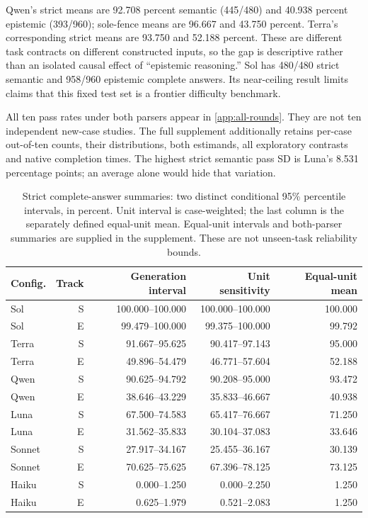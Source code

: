 \documentclass[a4paper,preprint,12pt,numbers,nopreprintline]{elsarticle}
\begin{document}
Qwen's strict means are 92.708 percent semantic (445/480) and 40.938 percent epistemic (393/960); sole-fence means are 96.667 and 43.750 percent. Terra's corresponding strict means are 93.750 and 52.188 percent. These are different task contracts on different constructed inputs, so the gap is descriptive rather than an isolated causal effect of ``epistemic reasoning.'' Sol has 480/480 strict semantic and 958/960 epistemic complete answers. Its near-ceiling result limits claims that this fixed test set is a frontier difficulty benchmark.

All ten pass rates under both parsers appear in \ref{app:all-rounds}. They are not ten independent new-case studies. The full supplement additionally retains per-case out-of-ten counts, their distributions, both estimands, all exploratory contrasts and native completion times. The highest strict semantic pass SD is Luna's 8.531 percentage points; an average alone would hide that variation.
\begin{table}[htbp]\centering\scriptsize
\caption{Strict complete-answer summaries: two distinct conditional 95\% percentile intervals, in percent. Unit interval is case-weighted; the last column is the separately defined equal-unit mean. Equal-unit intervals and both-parser summaries are supplied in the supplement. These are not unseen-task reliability bounds.}\label{tab:ten-pass-intervals}
\setlength{\tabcolsep}{3pt}
\begin{tabular}{lrrrr}\toprule
Config. & Track & Generation interval & Unit sensitivity & Equal-unit mean\\\midrule
Sol & S & 100.000--100.000 & 100.000--100.000 & 100.000\\
Sol & E & 99.479--100.000 & 99.375--100.000 & 99.792\\
Terra & S & 91.667--95.625 & 90.417--97.143 & 95.000\\
Terra & E & 49.896--54.479 & 46.771--57.604 & 52.188\\
Qwen & S & 90.625--94.792 & 90.208--95.000 & 93.472\\
Qwen & E & 38.646--43.229 & 35.833--46.667 & 40.938\\
Luna & S & 67.500--74.583 & 65.417--76.667 & 71.250\\
Luna & E & 31.562--35.833 & 30.104--37.083 & 33.646\\
Sonnet & S & 27.917--34.167 & 25.455--36.167 & 30.139\\
Sonnet & E & 70.625--75.625 & 67.396--78.125 & 73.125\\
Haiku & S & 0.000--1.250 & 0.000--2.250 & 1.250\\
Haiku & E & 0.625--1.979 & 0.521--2.083 & 1.250\\
\bottomrule\end{tabular}
\end{table}
\end{document}
